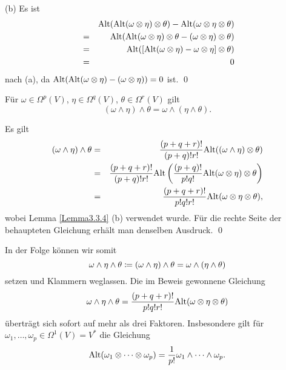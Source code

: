 \documentclass[a4paper,twoside,DIV15,BCOR12mm]{scrbook}
\begin{document}
\noindent
(b) Es ist
\begin{eqnarray*}
&   & {\rm Alt}({\rm Alt}(\omega \otimes \eta) \otimes \theta) - {\rm 
Alt}(\omega \otimes \eta \otimes \theta) \\
& = & {\rm Alt}({\rm Alt}(\omega \otimes \eta) \otimes \theta - 
(\omega \otimes \eta) \otimes \theta) \\
& = & {\rm Alt}([{\rm Alt}(\omega \otimes \eta) - \omega \otimes 
\eta] \otimes \theta) \\
& = & 0
\end{eqnarray*}
nach (a), da ${\rm Alt}({\rm Alt}(\omega \otimes \eta) - (\omega 
\otimes \eta)) = 0$ ist. \qed\\

\bigskip

\begin{satz}\label{Satz3.3.5} {Für $\omega \in \Omega^{p}(V)$, 
$\eta \in \Omega^{q}(V)$, $\theta \in \Omega^{r}(V)$ gilt}
\[ (\omega \wedge \eta) \wedge \theta = \omega \wedge (\eta \wedge 
\theta). \]
\end{satz}

\bigskip

 Es gilt
\begin{eqnarray*}
(\omega \wedge \eta) \wedge \theta & = & \frac{(p+q+r)!}{(p+q)!r!} 
{\rm Alt}((\omega \wedge \eta) \otimes \theta) \\
& = & \frac{(p+q+r)!}{(p+q)!r!} {\rm Alt}\left(\frac{(p+q)!}{p!q!} 
{\rm Alt}(\omega \otimes \eta) \otimes \theta\right) \\
& = & \frac{(p+q+r)!}{p!q!r!} {\rm Alt}(\omega \otimes \eta \otimes 
\theta),
\end{eqnarray*}
wobei Lemma \ref{Lemma3.3.4} (b) verwendet wurde. Für die rechte Seite der 
behaupteten Gleichung erhält man denselben Ausdruck. \qed\\

\bigskip

\noindent
In der Folge können wir somit
\[ \omega \wedge \eta \wedge \theta \da  (\omega \wedge \eta) \wedge 
\theta = \omega \wedge(\eta \wedge \theta) \]
setzen und Klammern weglassen. Die im Beweis gewonnene Gleichung
\[ \omega \wedge \eta \wedge \theta = \frac{(p+q+r)!}{p!q!r!} {\rm 
Alt}(\omega \otimes \eta \otimes \theta) \]
überträgt sich sofort auf mehr als drei Faktoren. Insbesondere gilt 
für $\omega_{1},\dots,\omega_{p} \in \Omega^{1}(V) = V^{*}$ die 
Gleichung
\[ {\rm Alt}(\omega_{1} \otimes \dots \otimes \omega_{p}) = 
\frac{1}{p!} \omega_{1} \wedge \dots \wedge \omega_{p}. \]
\end{document}
